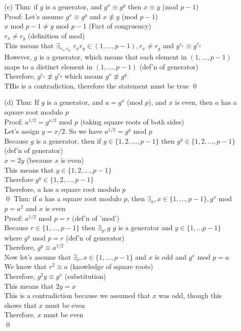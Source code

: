 \documentclass[11pt]{article}
\theoremstyle{definition}
\begin{document}
\begin{enumerate}
	\item[(c)]
	Thm: if $g$ is a generator, and $g^x \equiv g^y$ then $x \equiv y$ (mod $p-1$)\\
	\newline
	Proof: Let's assume $g^x \equiv g^y$ and $x \not\equiv y$ (mod $p-1$)\\
	$x \text{ mod } p-1 \neq y \text{ mod } p-1$ (Fact of congruency)\\
	$r_x \neq r_y$ (definition of mod)\\
	This means that $\exists_{r_x,r_y}$ $r_xr_y \in (1,...,p-1), r_x \neq r_y$ and $g^{r_x} \equiv g^{r_y}$\\
	However, $g$ is a generator, which means that each element in $(1,...,p-1)$ maps to a distinct element in $(1,...,p-1)$ (def'n of generator)\\
	Therefore, $g^{r_x} \not\equiv g^{r_y}$ which means $g^x \not\equiv g^y$\\
	THis is a contradiction, therefore the statement must be true
	\qed

	\item[(d)]
	Thm: If $g$ is a generator, and $a = g^x$ (mod $p$), and $x$ is even, then $a$ has a square root modulo $p$\\
	\newline
	Proof: $a^{1/2} = g^{x/2}$ mod $p$ (taking square roots of both sides)\\
	Let's assign $y = x/2$.  So we have $a^{1/2} = g^y$ mod $p$\\
	Because $g$ is a generator, then if $y \in \{1,2,...,p-1\}$ then $g^y \in \{1,2,...,p-1\}$ (def'n of generator)\\
	$x = 2y$ (because $x$ is even)\\
	This means that $y \in \{1,2,...,p-1\}$\\
	Therefore $g^y \in \{1,2,...,p-1\}$\\
	Therefore, $a$ has a square root modulo $p$\\
	\qed
	\newline
	Thm: if $a$ has a square root modulo $p$, then $\exists_x, x \in \{1,...,p-1\}, g^x$ mod $p = a^2$ and $x$ is even\\
	\newline
	Proof: $a^{1/2}$ mod $p = r$ (def'n of 'mod')\\
	Because $r \in \{1,...,p-1\}$ then $\exists_y,g$ $g$ is a generator and $y \in \{1,...p-1\}$ where $g^y \text{ mod } p = r$ (def'n of generator)\\
	Therefore, $g^y \equiv a^{1/2}$\\
	Now let's assume that $\exists_x, x \in \{1,...,p-1\}$ and $x$ is odd and $g^x \text{ mod } p = a$\\
	We know that $r^2 \equiv a$ (knowledge of square roots)\\
	Therefore, $g^2y \equiv g^x$ (substitution)\\
	This means that $2y = x$\\
	This is a contradiction because we assumed that $x$ was odd, though this shows that $x$ must be even\\
	Therefore, $x$ must be even\\
	\qed


\end{enumerate}
\end{document}
